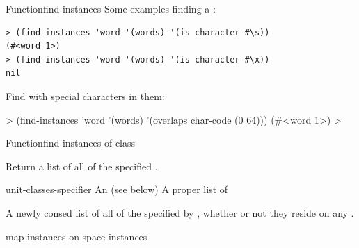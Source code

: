 \documentclass[10pt,twoside,english,pdftex]{article}
\begin{document}
\begin{functiondoc}{Function}{find-instances}
Some examples finding a  :
%
\W\supp
\begin{verbatim}
> (find-instances 'word '(words) '(is character #\s))
(#<word 1>)
> (find-instances 'word '(words) '(is character #\x))
nil
\end{verbatim}
%
Find   with special characters in them:
%
\W\supp\notpretop
\begin{example}
  > (find-instances 'word '(words) '(overlaps char-code (0 64)))
  (#<word 1>)
  >
\end{example}

\end{functiondoc}


\begin{functiondoc}{Function}{find-instances-of-class}%
  {
    \returns{} }
%
%
%

\fnsyntax

\fnpurpose Return a list of all  of the
specified .

\fnpackage {}

\fnmodule {}

\fnargs
\begin{args}{unit-classes-specifier}
 An 
(see below)
 A proper list of 
\end{args}

\fnreturns
{}%
%
A newly consed list of all  of the
 specified by ,
whether or not they reside on any .

\fndsyntax
\W\supp\tabletop
\unitclassesspec
\subclassingspec

\begin{alsos}{map-instances-on-space-instances}
\end{alsos}


\end{functiondoc}
\end{document}
